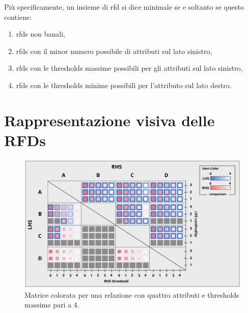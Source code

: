 Pi\`{u} specificamente, un insieme di \acrshort{rfd} si dice minimale se e soltanto se questo contiene:
\begin{enumerate}
    \item \acrshort{rfds} non banali,
    \item \acrshort{rfds} con il minor numero possibile di attributi sul lato sinistro,
    \item \acrshort{rfds} con le thresholds massime possibili per gli attributi sul lato sinistro,
    \item \acrshort{rfds} con le thresholds minime possibili per l'attributo sul lato destro.
\end{enumerate}

\section{Rappresentazione visiva delle RFDs}
\label{section:visual_rep_metaphore}
\begin{figure}[ht]
    \centering
    \includegraphics[width=\linewidth]{capitoli/figure/matrix_metaphore}
    \caption{Matrice colorata per una relazione con quattro attributi e thresholds massime pari a 4.}
    \label{fig:colored_matrix}
\end{figure}
